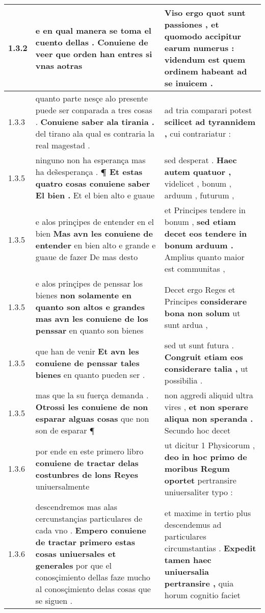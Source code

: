 \begin{tabular}{|p{1cm}|p{6.5cm}|p{6.5cm}|}
1.3.2 & e en qual manera se toma el cuento dellas . \textbf{ Conuiene de veer } que orden han entres si vnas aotras & Viso ergo quot sunt passiones , et quomodo accipitur earum numerus : \textbf{ videndum est quem ordinem habeant } ad se inuicem . \\\hline
1.3.3 & quanto parte nesçe alo presente puede ser conparada a tres cosas . \textbf{ Conuiene saber ala tirania . } del tirano ala qual es contraria la real magestad . & ad tria comparari potest \textbf{ scilicet ad tyrannidem , } cui contrariatur : \\\hline
1.3.5 & ninguno non ha esperança mas ha des̃esperança . \textbf{ ¶ Et estas quatro cosas conuiene saber El bien . } Et el bien alto e guaue & sed desperat . \textbf{ Haec autem quatuor , } videlicet , bonum , arduum , futurum , \\\hline
1.3.5 & e alos prinçipes de entender en el bien \textbf{ Mas avn les conuiene de entender } en bien alto e grande e guaue de fazer De mas desto & et Principes tendere in bonum , \textbf{ sed etiam decet eos tendere in bonum arduum . } Amplius quanto maior est communitas , \\\hline
1.3.5 & e alos prinçipes de penssar los bienes \textbf{ non solamente en quanto son altos e grandes mas avn les conuiene de los penssar } en quanto son bienes & Decet ergo Reges et Principes \textbf{ considerare bona non solum } ut sunt ardua , \\\hline
1.3.5 & que han de venir \textbf{ Et avn les conuiene de penssar tales bienes } en quanto pueden ser . & sed ut sunt futura . \textbf{ Congruit etiam eos considerare talia , } ut possibilia . \\\hline
1.3.5 & mas que la su fuerça demanda . \textbf{ Otrossi les conuiene de non esparar alguas cosas } que non son de esparar ¶ & non aggredi aliquid ultra vires , \textbf{ et non sperare aliqua non speranda . } Secundo hoc decet \\\hline
1.3.6 & por ende en este primero libro \textbf{ conuiene de tractar delas costunbres de lons Reyes } uniuersalmente & ut dicitur 1 Physicorum , \textbf{ deo in hoc primo de moribus Regum oportet } pertransire uniuersaliter typo : \\\hline
1.3.6 & descendremos mas alas cercunstançias particulares de cada vno . \textbf{ Empero conuiene de tractar primero estas cosas uniuersales et generales } por que el conosçimiento dellas faze mucho al conosçimiento delas cosas que se siguen . & et maxime in tertio plus descendemus ad particulares circumstantias . \textbf{ Expedit tamen haec uniuersalia pertransire , } quia horum cognitio faciet \\\hline

\end{tabular}
